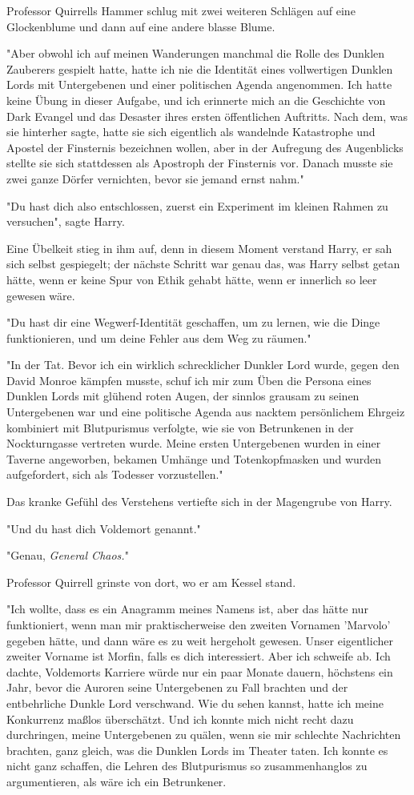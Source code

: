 {Professor Quirrells Hammer schlug mit zwei weiteren Schlägen auf eine Glockenblume und dann auf eine andere blasse Blume.

"Aber obwohl ich auf meinen Wanderungen manchmal die Rolle des Dunklen Zauberers gespielt hatte, hatte ich nie die Identität eines vollwertigen Dunklen Lords mit Untergebenen und einer politischen Agenda angenommen. Ich hatte keine Übung in dieser Aufgabe, und ich erinnerte mich an die Geschichte von Dark Evangel und das Desaster ihres ersten öffentlichen Auftritts. Nach dem, was sie hinterher sagte, hatte sie sich eigentlich als wandelnde Katastrophe und Apostel der Finsternis bezeichnen wollen, aber in der Aufregung des Augenblicks stellte sie sich stattdessen als Apostroph der Finsternis vor. Danach musste sie zwei ganze Dörfer vernichten, bevor sie jemand ernst nahm."

"Du hast dich also entschlossen, zuerst ein Experiment im kleinen Rahmen zu versuchen", sagte Harry.

Eine Übelkeit stieg in ihm auf, denn in diesem Moment verstand Harry, er sah sich selbst gespiegelt; der nächste Schritt war genau das, was Harry selbst getan hätte, wenn er keine Spur von Ethik gehabt hätte, wenn er innerlich so leer gewesen wäre.

"Du hast dir eine Wegwerf-Identität geschaffen, um zu lernen, wie die Dinge funktionieren, und um deine Fehler aus dem Weg zu räumen."

"In der Tat. Bevor ich ein wirklich schrecklicher Dunkler Lord wurde, gegen den David Monroe kämpfen musste, schuf ich mir zum Üben die Persona eines Dunklen Lords mit glühend roten Augen, der sinnlos grausam zu seinen Untergebenen war und eine politische Agenda aus nacktem persönlichem Ehrgeiz kombiniert mit Blutpurismus verfolgte, wie sie von Betrunkenen in der Nockturngasse vertreten wurde. Meine ersten Untergebenen wurden in einer Taverne angeworben, bekamen Umhänge und Totenkopfmasken und wurden aufgefordert, sich als Todesser vorzustellen."

Das kranke Gefühl des Verstehens vertiefte sich in der Magengrube von Harry.

"Und du hast dich Voldemort genannt."

"Genau, \emph{General Chaos.}"

Professor Quirrell grinste von dort, wo er am Kessel stand.

"Ich wollte, dass es ein Anagramm meines Namens ist, aber das hätte nur funktioniert, wenn man mir praktischerweise den zweiten Vornamen 'Marvolo' gegeben hätte, und dann wäre es zu weit hergeholt gewesen. Unser eigentlicher zweiter Vorname ist Morfin, falls es dich interessiert. Aber ich schweife ab. Ich dachte, Voldemorts Karriere würde nur ein paar Monate dauern, höchstens ein Jahr, bevor die Auroren seine Untergebenen zu Fall brachten und der entbehrliche Dunkle Lord verschwand. Wie du sehen kannst, hatte ich meine Konkurrenz maßlos überschätzt. Und ich konnte mich nicht recht dazu durchringen, meine Untergebenen zu quälen, wenn sie mir schlechte Nachrichten brachten, ganz gleich, was die Dunklen Lords im Theater taten. Ich konnte es nicht ganz schaffen, die Lehren des Blutpurismus so zusammenhanglos zu argumentieren, als wäre ich ein Betrunkener.

}
